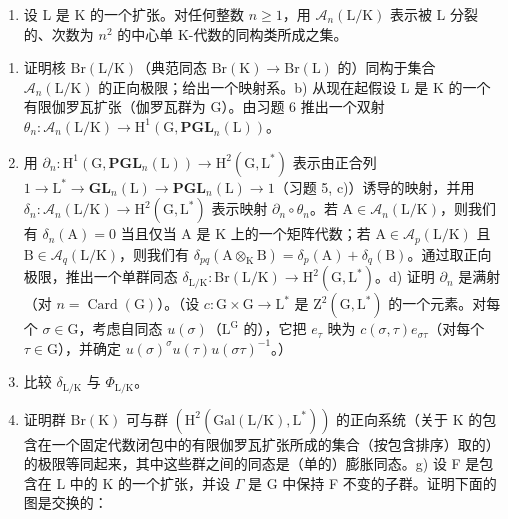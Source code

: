 \begin{enumerate}
\def\labelenumi{\arabic{enumi})}
\setcounter{enumi}{6}
\tightlist
\item
  设 L 是 K 的一个扩张。对任何整数 \(n \geqslant 1\)，用 \(\mathcal{A}_{n}(\mathrm{L}/\mathrm{K})\) 表示被 L 分裂的、次数为 \(n^{2}\) 的中心单 K-代数的同构类所成之集。
\end{enumerate}

\begin{enumerate}
\def\labelenumi{\alph{enumi})}
\item
  证明核 \(\mathrm{Br}(\mathrm{L} / \mathrm{K})\)（典范同态 \(\mathrm{Br}(\mathrm{K})\to \mathrm{Br}(\mathrm{L})\) 的）同构于集合 \(\mathcal{A}_n(\mathrm{L} / \mathrm{K})\) 的正向极限；给出一个映射系。b) 从现在起假设 L 是 K 的一个有限伽罗瓦扩张（伽罗瓦群为 G）。由习题 6 推出一个双射 \(\theta_{n}:\mathcal{A}_{n}(\mathrm{L} / \mathrm{K})\to \mathrm{H}^{1}(\mathrm{G},\mathbf{PGL}_{n}(\mathrm{L}))\)。
\item
  用 \(\partial_n: \mathrm{H}^1(\mathrm{G}, \mathbf{PGL}_n(\mathrm{L})) \to \mathrm{H}^2(\mathrm{G}, \mathrm{L}^*)\) 表示由正合列 \(1 \to \mathrm{L}^* \to \mathbf{GL}_n(\mathrm{L}) \to \mathbf{PGL}_n(\mathrm{L}) \to 1\)（习题 5, c)）诱导的映射，并用 \(\delta_n: \mathcal{A}_n(\mathrm{L/K}) \to \mathrm{H}^2(\mathrm{G}, \mathrm{L}^*)\) 表示映射 \(\partial_n \circ \theta_n\)。若 \(\mathrm{A} \in \mathcal{A}_n(\mathrm{L/K})\)，则我们有 \(\delta_n(\mathrm{A}) = 0\) 当且仅当 \(\mathrm{A}\) 是 \(\mathrm{K}\) 上的一个矩阵代数；若 \(\mathrm{A} \in \mathcal{A}_p(\mathrm{L/K})\) 且 \(\mathrm{B} \in \mathcal{A}_q(\mathrm{L/K})\)，则我们有 \(\delta_{pq}(\mathrm{A} \otimes_{\mathrm{K}} \mathrm{B}) = \delta_p(\mathrm{A}) + \delta_q(\mathrm{B})\)。通过取正向极限，推出一个单群同态 \(\delta_{\mathrm{L/K}}: \mathrm{Br}(\mathrm{L/K}) \to \mathrm{H}^2(\mathrm{G}, \mathrm{L}^*)\)。d) 证明 \(\partial_n\) 是满射（对 \(n = \operatorname{Card}(\mathrm{G})\)）。（设 \(c: \mathrm{G} \times \mathrm{G} \to \mathrm{L}^*\) 是 \(\mathrm{Z}^2(\mathrm{G}, \mathrm{L}^*)\) 的一个元素。对每个 \(\sigma \in \mathrm{G}\)，考虑自同态 \(u(\sigma)\)（\(\mathrm{L}^{\mathrm{G}}\) 的），它把 \(e_\tau\) 映为 \(c(\sigma, \tau)e_{\sigma\tau}\)（对每个 \(\tau \in \mathrm{G}\)），并确定 \(u(\sigma)^{\sigma}u(\tau)u(\sigma\tau)^{-1}\)。）
\item
  比较 \(\delta_{\mathrm{L / K}}\) 与 \(\Phi_{\mathrm{L / K}}\)。
\item
  证明群 \(\mathrm{Br}(\mathrm{K})\) 可与群 \(\left(\mathrm{H}^{2}(\mathrm{Gal}(\mathrm{L}/\mathrm{K}),\mathrm{L}^{*})\right)\) 的正向系统（关于 K 的包含在一个固定代数闭包中的有限伽罗瓦扩张所成的集合（按包含排序）取的）的极限等同起来，其中这些群之间的同态是（单的）膨胀同态。g) 设 F 是包含在 L 中的 K 的一个扩张，并设 \(\Gamma\) 是 G 中保持 F 不变的子群。证明下面的图是交换的：
\end{enumerate}

